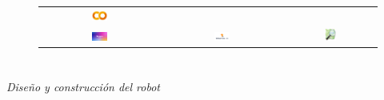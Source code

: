 \documentclass{beamer}
\begin{document}
\begin{frame}
\begin{figure}
\begin{tabular}{ccc}
		\includegraphics[width=0.14\textwidth]{figs/googlecolab.png} \\
		\includegraphics[width=0.14\textwidth]{figs/yolov8.png} &
		\includegraphics[width=0.14\textwidth]{figs/tflite.png} &
		\includegraphics[width=0.14\textwidth]{figs/osm.png}

	\end{tabular}
	\end{figure}	
\end{frame}


\section*{}
\begin{frame}{}
	\centering \Huge
	\emph{Diseño y construcción del robot}
\end{frame}
\end{document}
